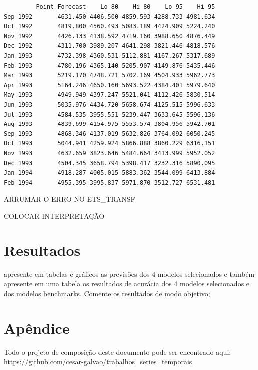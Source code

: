 \documentclass[
  letterpaper,
  DIV=11,
  numbers=noendperiod]{scrartcl}
\begin{document}
\begin{verbatim}
         Point Forecast    Lo 80    Hi 80    Lo 95    Hi 95
Sep 1992       4631.450 4406.500 4859.593 4288.733 4981.634
Oct 1992       4819.800 4560.493 5083.189 4424.909 5224.240
Nov 1992       4426.133 4138.592 4719.160 3988.650 4876.449
Dec 1992       4311.700 3989.207 4641.298 3821.446 4818.576
Jan 1993       4732.398 4360.531 5112.881 4167.267 5317.689
Feb 1993       4780.196 4365.140 5205.907 4149.876 5435.446
Mar 1993       5219.170 4748.721 5702.169 4504.933 5962.773
Apr 1993       5164.246 4650.160 5693.522 4384.401 5979.640
May 1993       4949.949 4397.247 5521.041 4112.426 5830.514
Jun 1993       5035.976 4434.720 5658.674 4125.515 5996.633
Jul 1993       4584.535 3955.551 5239.447 3633.645 5596.136
Aug 1993       4839.699 4154.975 5553.574 3804.956 5942.701
Sep 1993       4868.346 4137.019 5632.826 3764.092 6050.245
Oct 1993       5044.941 4259.924 5866.888 3860.229 6316.151
Nov 1993       4632.659 3823.646 5484.664 3413.999 5952.052
Dec 1993       4504.345 3658.794 5398.417 3232.316 5890.095
Jan 1994       4918.287 4005.015 5883.362 3544.099 6413.884
Feb 1994       4955.395 3995.837 5971.870 3512.727 6531.481
\end{verbatim}

ARRUMAR O ERRO NO ETS\_TRANSF

COLOCAR INTERPRETAÇÃO

\hypertarget{resultados}{%
\section{Resultados}\label{resultados}}

apresente em tabelas e gráficos as previsões dos 4 modelos selecionados
e também apresente em uma tabela os resultados de acurácia dos 4 modelos
selecionados e dos modelos benchmarks. Comente os resultados de modo
objetivo;

\hypertarget{apuxeandice}{%
\section{Apêndice}\label{apuxeandice}}

Todo o projeto de composição deste documento pode ser encontrado aqui:
\url{https://github.com/cesar-galvao/trabalhos_series_temporais}
\end{document}
